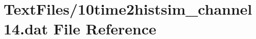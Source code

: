 \hypertarget{10time2histsim__channel14_8dat}{}\section{Text\+Files/10time2histsim\+\_\+channel14.dat File Reference}
\label{10time2histsim__channel14_8dat}
